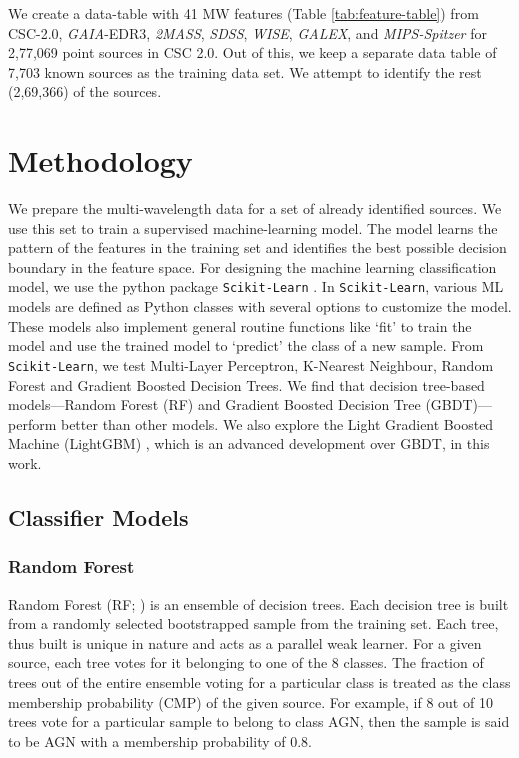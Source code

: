 \documentclass[fleqn,usenatbib]{mnras}
\begin{document}
     We create a data-table with 41 MW features (Table \ref{tab:feature-table}) from CSC-2.0, {\em GAIA}-EDR3, {\em 2MASS}, {\em SDSS}, {\em WISE}, {\em GALEX}, and {\em MIPS-Spitzer} for 2,77,069 point sources in CSC 2.0. Out of this, we keep a separate data table of 7,703 known sources as the training data set. We attempt to identify the rest (2,69,366) of the sources.
    
\section{Methodology}\label{sec:method}
    We prepare the multi-wavelength data for a set of already identified sources. We use this set to train a supervised machine-learning model. The model learns the pattern of the features in the training set and identifies the best possible decision boundary in the feature space. For designing the machine learning classification model, we use the python package \texttt{Scikit-Learn} \citep{scikit-learn}. In \texttt{Scikit-Learn}, various ML models are defined as Python classes with several options to customize the model. These models also implement general routine functions like `fit' to train the model and use the trained model to `predict' the class of a new sample. From \texttt{Scikit-Learn}, we test Multi-Layer Perceptron, K-Nearest Neighbour, Random Forest and Gradient Boosted Decision Trees. 
    We find that decision tree-based models---Random Forest (RF) and Gradient Boosted Decision Tree (GBDT)---perform better than other models. We also explore the Light Gradient Boosted Machine (LightGBM) \citep{ke2017lightgbm}, which is an advanced development over GBDT, in this work. 
    \subsection{Classifier Models}
        \subsubsection{Random Forest}
        Random Forest (RF; \cite{randomforest}) is an ensemble of decision trees. Each decision tree is built from a randomly selected bootstrapped sample from the training set. Each tree, thus built is unique in nature and acts as a parallel weak learner. For a given source, each tree votes for it belonging to one of the 8 classes. The fraction of trees out of the entire ensemble voting for a particular class is treated as the class membership probability (CMP) of the given source. For example, if 8 out of 10 trees vote for a particular sample to belong to class AGN, then the sample is said to be AGN with a membership probability of 0.8.
\end{document}
